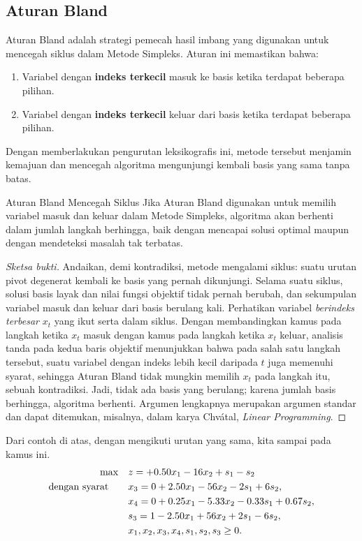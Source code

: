 \subsection{Aturan Bland}
Aturan Bland adalah strategi pemecah hasil imbang yang digunakan untuk mencegah siklus dalam Metode Simpleks. Aturan ini memastikan bahwa:
\begin{enumerate}
    \item Variabel dengan \textbf{indeks terkecil} masuk ke basis ketika terdapat beberapa pilihan.
    \item Variabel dengan \textbf{indeks terkecil} keluar dari basis ketika terdapat beberapa pilihan.
\end{enumerate}
Dengan memberlakukan pengurutan leksikografis ini, metode tersebut menjamin kemajuan dan mencegah algoritma mengunjungi kembali basis yang sama tanpa batas.

\begin{theorem}{Aturan Bland Mencegah Siklus}{}
Jika Aturan Bland digunakan untuk memilih variabel masuk dan keluar dalam Metode Simpleks, algoritma akan berhenti dalam jumlah langkah berhingga, baik dengan mencapai solusi optimal maupun dengan mendeteksi masalah tak terbatas.
\end{theorem}

\begin{proof}[Sketsa bukti]
Andaikan, demi kontradiksi, metode mengalami siklus: suatu urutan pivot degenerat kembali ke basis yang pernah dikunjungi. Selama suatu siklus, solusi basis layak dan nilai fungsi objektif tidak pernah berubah, dan sekumpulan variabel masuk dan keluar dari basis berulang kali. Perhatikan variabel \emph{berindeks terbesar} $x_t$ yang ikut serta dalam siklus. Dengan membandingkan kamus pada langkah ketika $x_t$ masuk dengan kamus pada langkah ketika $x_t$ keluar, analisis tanda pada kedua baris objektif menunjukkan bahwa pada salah satu langkah tersebut, suatu variabel dengan indeks lebih kecil daripada $t$ juga memenuhi syarat, sehingga Aturan Bland tidak mungkin memilih $x_t$ pada langkah itu, sebuah kontradiksi. Jadi, tidak ada basis yang berulang; karena jumlah basis berhingga, algoritma berhenti. Argumen lengkapnya merupakan argumen standar dan dapat ditemukan, misalnya, dalam karya Chv\'atal, \emph{Linear Programming}.
\end{proof}

Dari contoh di atas, dengan mengikuti urutan yang sama, kita sampai pada kamus ini.
\[
\begin{aligned}
\max \quad & z = +0.50x_1 - 16x_2 + s_1 - s_2 \\
\mbox{dengan syarat}\quad \quad 
& x_3 = 0 + 2.50x_1 - 56x_2 - 2s_1 + 6s_2, \\
& x_4 = 0 + 0.25x_1 - 5.33x_2 - 0.33s_1 + 0.67s_2, \\
& s_3 = 1 - 2.50x_1 + 56x_2 + 2s_1 - 6s_2, \\
& x_1, x_2, x_3, x_4, s_1, s_2, s_3 \geq 0.
\end{aligned}
\]


